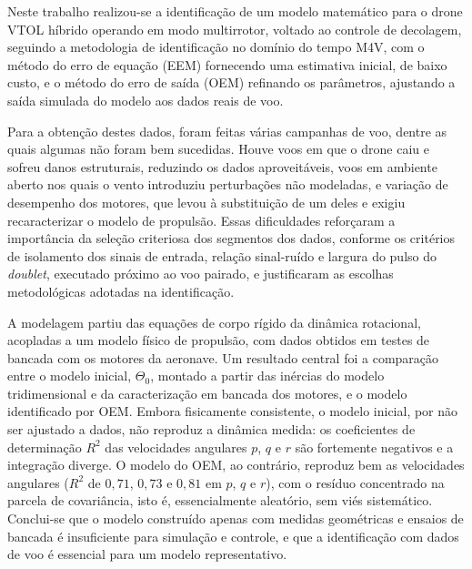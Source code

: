 
Neste trabalho realizou-se a identificação de um modelo matemático para o drone VTOL híbrido operando em modo multirrotor, voltado ao controle de decolagem, seguindo a metodologia de identificação no domínio do tempo M4V, com o método do erro de equação (EEM) fornecendo uma estimativa inicial, de baixo custo, e o método do erro de saída (OEM) refinando os parâmetros, {\color{blue}ajustando a saída simulada do modelo aos dados reais de voo}.

Para a obtenção destes dados, foram feitas várias campanhas de voo, dentre as quais algumas não foram bem sucedidas. {\color{blue}Houve voos em que o drone caiu e sofreu danos estruturais, reduzindo os dados aproveitáveis, voos em ambiente aberto nos quais o vento introduziu perturbações não modeladas, e variação de desempenho dos motores, que levou à substituição de um deles e exigiu recaracterizar o modelo de propulsão.} Essas dificuldades reforçaram a importância da seleção criteriosa dos segmentos dos dados, conforme os critérios de isolamento dos sinais de entrada, relação sinal-ruído e {\color{blue}largura do pulso do \textit{doublet}, executado próximo ao voo pairado}, e justificaram as escolhas metodológicas adotadas na identificação.

A modelagem partiu das equações de corpo rígido da dinâmica rotacional, acopladas a um modelo físico de propulsão, com dados obtidos em testes de bancada com os motores da aeronave. Um resultado central foi a comparação entre o modelo inicial, $\Theta_0$, montado a partir das inércias do modelo tridimensional e da caracterização em bancada dos motores, {\color{blue}e o modelo identificado por OEM}. Embora fisicamente consistente, o modelo inicial, por não ser ajustado a dados, não reproduz a dinâmica medida: os coeficientes de determinação $R^2$ das velocidades angulares $p$, $q$ e $r$ são fortemente negativos e a integração diverge. O modelo do OEM, ao contrário, reproduz bem as velocidades angulares ($R^2$ de {\color{blue}$0{,}71$, $0{,}73$ e $0{,}81$} em $p$, $q$ e $r$), com o resíduo concentrado na parcela de covariância, isto é, essencialmente aleatório, sem viés sistemático. {\color{blue}Conclui-se que o modelo construído apenas com medidas geométricas e ensaios de bancada é insuficiente para simulação e controle, e que a identificação com dados de voo é essencial para um modelo representativo.}

